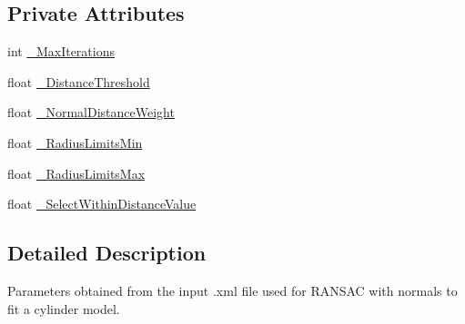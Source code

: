 \subsection*{Private Attributes}
\begin{DoxyCompactItemize}
\item 
int \hyperlink{classSACSegmentationFromNormalsParameters_a4340d179cf8bc322584e3e2be7796e33}{\-\_\-\-Max\-Iterations}
\item 
float \hyperlink{classSACSegmentationFromNormalsParameters_a201be70c60de5149b9dd6f9f5c9e8c42}{\-\_\-\-Distance\-Threshold}
\item 
float \hyperlink{classSACSegmentationFromNormalsParameters_a55722dfeabca62b56d34eba8c9e4eb68}{\-\_\-\-Normal\-Distance\-Weight}
\item 
float \hyperlink{classSACSegmentationFromNormalsParameters_a2e40fece611720af350f29efb9ec8f64}{\-\_\-\-Radius\-Limits\-Min}
\item 
float \hyperlink{classSACSegmentationFromNormalsParameters_a5113c354ef62226795c08e9d878cea70}{\-\_\-\-Radius\-Limits\-Max}
\item 
float \hyperlink{classSACSegmentationFromNormalsParameters_aed87f8bf3a354bad40628380f8dfe037}{\-\_\-\-Select\-Within\-Distance\-Value}
\end{DoxyCompactItemize}


\subsection{Detailed Description}
Parameters obtained from the input .xml file used for R\-A\-N\-S\-A\-C with normals to fit a cylinder model. 

